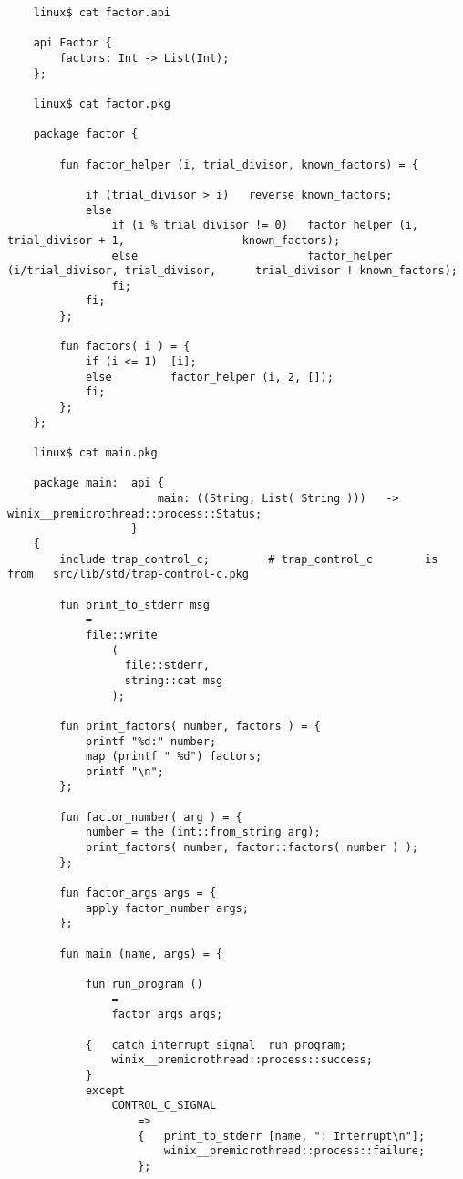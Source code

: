\begin{verbatim}
    linux$ cat factor.api

    api Factor {
        factors: Int -> List(Int);
    };

    linux$ cat factor.pkg

    package factor {

        fun factor_helper (i, trial_divisor, known_factors) = {

            if (trial_divisor > i)   reverse known_factors;
            else
                if (i % trial_divisor != 0)   factor_helper (i,               trial_divisor + 1,                  known_factors);
                else                          factor_helper (i/trial_divisor, trial_divisor,      trial_divisor ! known_factors);
                fi;
            fi;
        };

        fun factors( i ) = {
            if (i <= 1)  [i];
            else         factor_helper (i, 2, []);
            fi;
        };
    };

    linux$ cat main.pkg

    package main:  api {
                       main: ((String, List( String )))   ->   winix__premicrothread::process::Status;
                   }
    {
        include trap_control_c;         # trap_control_c        is from   src/lib/std/trap-control-c.pkg

        fun print_to_stderr msg
            =
            file::write
                (
                  file::stderr,
                  string::cat msg
                );

        fun print_factors( number, factors ) = {
            printf "%d:" number;
            map (printf " %d") factors;
            printf "\n";
        };

        fun factor_number( arg ) = {
            number = the (int::from_string arg);
            print_factors( number, factor::factors( number ) );
        };

        fun factor_args args = {
            apply factor_number args;
        };

        fun main (name, args) = {

            fun run_program ()
                =
                factor_args args;

            {   catch_interrupt_signal  run_program;
                winix__premicrothread::process::success;
            }
            except
                CONTROL_C_SIGNAL
                    =>
                    {   print_to_stderr [name, ": Interrupt\n"];
                        winix__premicrothread::process::failure;
                    };


\end{verbatim}
